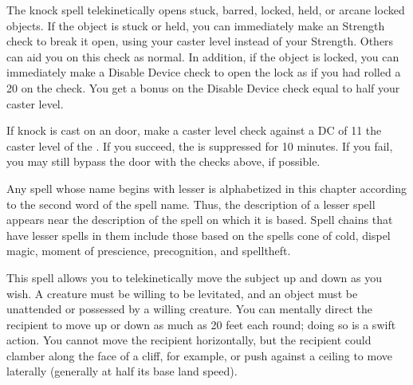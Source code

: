 \begin{comment}
\subsubsection{J-L}
\end{comment}

\spellrng{\rngclose}
\begin{spelleffect}
  The knock spell telekinetically opens stuck, barred, locked, held, or arcane locked objects. If the object is stuck or held, you can immediately make an Strength check to break it open, using your caster level instead of your Strength. Others can aid you on this check as normal. In addition, if the object is locked, you can immediately make a Disable Device check to open the lock as if you had rolled a 20 on the check. You get a bonus on the Disable Device check equal to half your caster level.
\end{spelleffect}
\begin{spellnotes}
  If knock is cast on an  door, make a caster level check against a DC of 11 \add the caster level of the . If you succeed, the  is suppressed for 10 minutes. If you fail, you may still bypass the door with the checks above, if possible.
\end{spellnotes}

\par Any spell whose name begins with lesser is alphabetized in this chapter according to the second word of the spell name. Thus, the description of a lesser spell appears near the description of the spell on which it is based. Spell chains that have lesser spells in them include those based on the spells cone of cold, dispel magic, moment of prescience, precognition, and spelltheft.

\spellrng{\rngclose}
\begin{spelleffect}
  This spell allows you to telekinetically move the subject up and down as you wish. A creature must be willing to be levitated, and an object must be unattended or possessed by a willing creature. You can mentally direct the recipient to move up or down as much as 20 feet each round; doing so is a swift action. You cannot move the recipient horizontally, but the recipient could clamber along the face of a cliff, for example, or push against a ceiling to move laterally (generally at half its base land speed).
\end{spelleffect}

